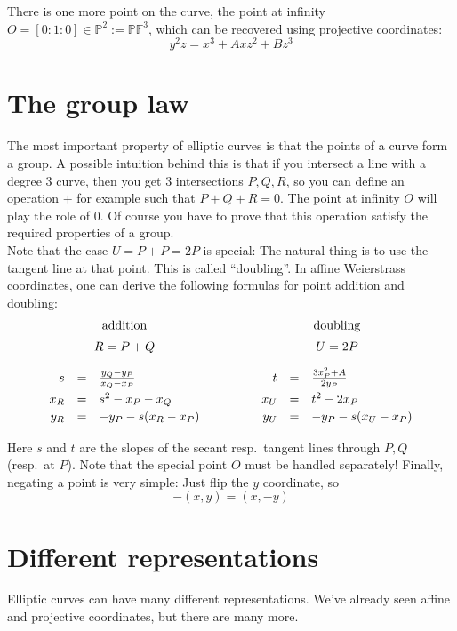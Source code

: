 \documentclass[12pt,draft,a4paper,openany,oneside]{amsbook}
\def\qquad{\quad\quad}
\def\F{\mathbb{F}}
\def\P{\mathbb{P}}
\theoremstyle{plain}
\theoremstyle{definition}
\begin{document}
There is one more point on the curve, the point at infinity $O=[0:1:0]\in\P^2:=\P\F^3$,
which can be recovered using projective coordinates:
\[ y^2z = x^3 + Axz^2 + Bz^3 \]

\section{The group law}

The most important property of elliptic curves is that the points of a curve form a group.
A possible intuition behind this is that if you intersect a line with a degree 3 curve,
then you get 3 intersections $P,Q,R$, so you can define an operation $+$ for example
such that $P+Q+R=0$. The point at infinity $O$ will play the role of $0$. Of course
you have to prove that this operation satisfy the required properties of a group.\\

Note that the case $U=P+P=2P$ is special: The natural thing is to use the tangent line at
that point. This is called ``doubling''. In affine Weierstrass coordinates, one can
derive the following formulas for point addition and doubling:\\
\[
\begin{array}{rclcrcl}
\multicolumn{3}{c}{\textrm{addition}} &
\multicolumn{1}{c}{\qquad} &
\multicolumn{3}{c}{\textrm{doubling}} \\[5pt]
\multicolumn{3}{c}{R=P+Q}  &
\multicolumn{1}{c}{\qquad} &
\multicolumn{3}{c}{U=2P}   \\[10pt]
 s   &=& \frac{y_Q-y_P}{x_Q-x_P}  & \quad\quad\quad &  t   &=& \frac{3x_P^2+A}{2 y_P}  \\[5pt]
 x_R &=&  s^2 - x_P - x_Q         & \quad\quad\quad &  x_U &=&  t^2 - 2x_P             \\[2pt]
 y_R &=& -y_P - s(x_R - x_P)      & \quad\quad\quad &  y_U &=& - y_P - s(x_U - x_P)    \\[5pt]
\end{array}
\]
Here $s$ and $t$ are the slopes of the secant resp.~tangent lines through $P,Q$
(resp.~at $P$). Note that the special point $O$ must be handled separately!
Finally, negating a point is very simple: Just flip the $y$ coordinate, so 
\[ -(x,y) = (x,-y) \]

\section{Different representations}

Elliptic curves can have many different representations. We've already seen
affine and projective coordinates, but there are many more.\\
\end{document}
